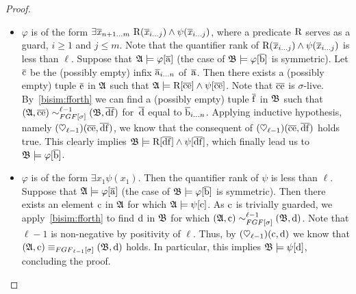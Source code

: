 \begin{proof}
\begin{itemize}
  \item $\varphi$ is of the form $\exists{\vartuplexfromto{n{+}1}{m}}\ \relR(\vartuplexfromto{i}{j}) \land \psi(\vartuplexfromto{i}{j})$, where a predicate $\mathrm{R}$ serves as a guard, $i \geq 1$ and $j \leq m$.
  Note that the quantifier rank of $\mathrm{R}(\overline{\mathit{x}}_{i\ldots j}) \land \psi(\overline{\mathit{x}}_{i\ldots j})$ is less than $\ell$.
  Suppose that ${\mathfrak{A}} \models \varphi[\overline{\mathrm{a}}]$ (the case of ${\mathfrak{B}} \models \varphi[\overline{\mathrm{b}}]$ is symmetric).
  Let $\overline{\mathrm{c}}$ be the (possibly empty) infix $\overline{\mathrm{a}}_{i\ldots n}$ of~$\overline{\mathrm{a}}$.
  Then there exists a (possibly empty) tuple $\overline{\mathrm{e}}$ in ${\mathfrak{A}}$ such that ${\mathfrak{A}} \models \mathrm{R}[\overline{\mathrm{c}}\overline{\mathrm{e}}] \land \psi[\overline{\mathrm{c}}\overline{\mathrm{e}}]$.
  Note that $\overline{\mathrm{c}}\overline{\mathrm{e}}$ is $\sigma$-live. 
  By~\ref{bisim:fforth} we can find a (possibly empty) tuple $\overline{\mathrm{f}}$ in ${\mathfrak{B}}$ such that $(\str{A}, \elemtuplec\elemtuplee) \bisimto_{\FGF[\sigma]}^{\ell{-}1} (\str{B}, \elemtupled\elemtuplef)$ for~$\overline{\mathrm{d}}$ equal to $\overline{\mathrm{b}}_{i\ldots n}$.
  Applying inductive hypothesis, namely $(\heartsuit_{\ell{-}1})(\overline{\mathrm{c}}\overline{\mathrm{e}},\overline{\mathrm{d}}\overline{\mathrm{f}})$, we know that the consequent of $(\heartsuit_{\ell{-}1})(\overline{\mathrm{c}}\overline{\mathrm{e}},\overline{\mathrm{d}}\overline{\mathrm{f}})$ holds true.
  This clearly implies ${\mathfrak{B}} \models \mathrm{R}[\overline{\mathrm{d}}\overline{\mathrm{f}}] \land \psi[\overline{\mathrm{d}}\overline{\mathrm{f}}]$, which finally lead us to ${\mathfrak{B}} \models \varphi[\overline{\mathrm{b}}]$.

  \item $\varphi$ is of the form $\exists{x_{1}} \psi(x_1)$. Then the quantifier rank of $\psi$ is less than $\ell$.
  Suppose that ${\mathfrak{A}} \models \varphi[\overline{\mathrm{a}}]$ (the case of ${\mathfrak{B}} \models \varphi[\overline{\mathrm{b}}]$ is symmetric).
  Then there exists an element $\mathrm{c}$ in ${\mathfrak{A}}$ for which ${\mathfrak{A}} \models \psi[\mathrm{c}]$.
  As $\mathrm{c}$ is trivially guarded, we apply~\ref{bisim:fforth} to find $\mathrm{d}$ in ${\mathfrak{B}}$ for which $(\str{A}, \elem{c}) \bisimto_{\FGF[\sigma]}^{\ell{-}1} (\str{B}, \elem{d})$.
  Note that $\ell{-}1$ is non-negative by positivity of $\ell$. 
  Thus, by $(\heartsuit_{\ell{-}1})(\mathrm{c},\mathrm{d})$ we know that $(\str{A}, \elem{c}) \equiv_{\FGF_{\ell{-}1}[\sigma]} (\str{B}, \elem{d})$ holds. 
  In particular, this implies ${\mathfrak{B}} \models \psi[\mathrm{d}]$, concluding the proof.
\end{itemize}


\end{proof}
